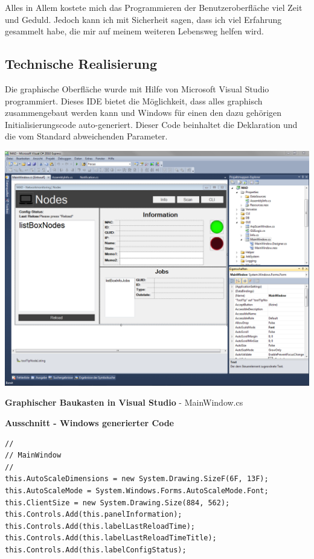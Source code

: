 \documentclass[12pt,a4paper]{report}
\begin{document}
\begin{onehalfspace}
Alles in Allem kostete mich das Programmieren der Benutzeroberfläche viel Zeit und Geduld. Jedoch kann ich mit Sicherheit sagen, dass ich viel Erfahrung gesammelt habe, die mir auf meinem weiteren Lebensweg helfen wird.

\subsection{Technische Realisierung}
Die graphische Oberfläche wurde mit Hilfe von Microsoft Visual Studio programmiert. Dieses IDE bietet die Möglichkeit, dass alles graphisch zusammengebaut werden kann und Windows für einen den dazu gehörigen Initialisierungscode auto-generiert. Dieser Code beinhaltet die Deklaration und die vom Standard abweichenden Parameter. \\
\begin{center}
\includegraphics[scale=0.5]{../docs/lyaton/graphics/Real_IDE.png}
\begin{scriptsize}
\textbf{Graphischer Baukasten in Visual Studio} - MainWindow.cs
\end{scriptsize}
\end{center}
\textbf{Ausschnitt - Windows generierter Code}
\begin{lstlisting}
// 
// MainWindow
// 
this.AutoScaleDimensions = new System.Drawing.SizeF(6F, 13F);
this.AutoScaleMode = System.Windows.Forms.AutoScaleMode.Font;
this.ClientSize = new System.Drawing.Size(884, 562);
this.Controls.Add(this.panelInformation);
this.Controls.Add(this.labelLastReloadTime);
this.Controls.Add(this.labelLastReloadTimeTitle);
this.Controls.Add(this.labelConfigStatus);

\end{lstlisting}
\end{onehalfspace}
\end{document}
